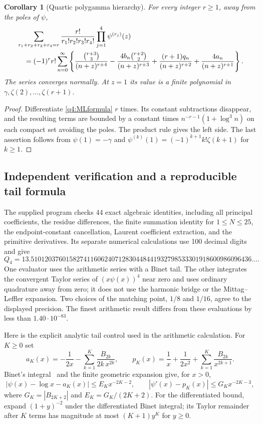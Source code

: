 \documentclass[11pt,a4paper]{article}
\numberwithin{equation}{section}
\newtheorem{corollary}[theorem]{Corollary}
\theoremstyle{definition}
\theoremstyle{remark}
\begin{document}
\begin{corollary}[Quartic polygamma hierarchy]\label{q4:derivatives}
For every integer $r\geq1$, away from the poles of $\psi$,
\begin{align}\label{q4:allpolygamma}
 &\sum_{r_1+r_2+r_3+r_4=r}
       \frac{r!}{r_1!r_2!r_3!r_4!}
       \prod_{j=1}^4\psi^{(r_j)}(z)\notag\\
 &\quad=(-1)^rr!\sum_{n=0}^{\infty}
       \left\{\frac{\binom{r+3}{3}}{(n+z)^{r+4}}
       -\frac{4b_n\binom{r+2}{2}}{(n+z)^{r+3}}
       +\frac{(r+1)q_n}{(n+z)^{r+2}}
       +\frac{4a_n}{(n+z)^{r+1}}\right\}.
\end{align}
The series converges normally.  At $z=1$ its value is a finite polynomial
in $\gamma,\zeta(2),\ldots,\zeta(r+1)$.
\end{corollary}
\begin{proof}
Differentiate \eqref{q4:MLformula} $r$ times.  Its constant subtractions
disappear, and the resulting terms are bounded by a constant times
$n^{-r-1}(1+\log^3n)$ on each compact set avoiding the poles.
The product rule gives the left side.  The last assertion follows from
$\psi(1)=-\gamma$ and
$\psi^{(k)}(1)=(-1)^{k+1}k!\zeta(k+1)$ for $k\geq1$.
\end{proof}

\subsection{Independent verification and a reproducible tail formula}

The supplied program checks 44 exact algebraic identities, including
all principal coefficients, the residue differences, the finite
summation identity for $1\leq N\leq25$, the endpoint-constant
cancellation, Laurent coefficient extraction, and the primitive
derivatives.  Its separate numerical calculations use 100 decimal
digits and give
\[
 Q_4=13.510120376015827411606240712830448441932798533301918600986096436\ldots.
\]
One evaluator uses the arithmetic series with a Binet tail.  The other
integrates the convergent Taylor series of $(x\psi(x))^4$ near zero and
uses ordinary quadrature away from zero; it does not use the harmonic
bridge or the Mittag--Leffler expansion.  Two choices of the matching
point, $1/8$ and $1/16$, agree to the displayed precision.  The finest
arithmetic result differs from these evaluations by less than
$1.40\cdot10^{-83}$.

Here is the explicit analytic tail control used in the arithmetic
calculation.  For $K\geq0$ set
\[
 a_K(x)=-\frac1{2x}-\sum_{k=1}^K\frac{B_{2k}}{2k\,x^{2k}},
 \qquad
 p_K(x)=\frac1x+\frac1{2x^2}
                      +\sum_{k=1}^K\frac{B_{2k}}{x^{2k+1}}.
\]
Binet's integral~\cite[Equation~5.9.15]{DLMF} and the finite
geometric expansion give, for $x>0$,
\[
 |\psi(x)-\log x-a_K(x)|\leq E_Kx^{-2K-2},\qquad
 |\psi'(x)-p_K(x)|\leq G_Kx^{-2K-3},
\]
where $G_K=|B_{2K+2}|$ and $E_K=G_K/(2K+2)$.
For the differentiated bound, expand $(1+y)^{-2}$ under the differentiated
Binet integral; its Taylor remainder after $K$ terms has magnitude at
most $(K+1)y^K$ for $y\geq0$.
\end{document}
